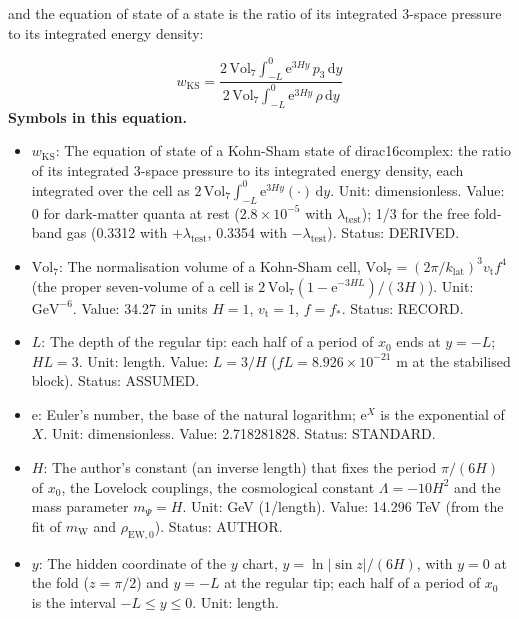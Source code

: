 \documentclass[
  10pt,
]{article}
\providecommand{\tightlist}{%
  \setlength{\itemsep}{0pt}\setlength{\parskip}{0pt}}
\begin{document}
and the equation of state of a state is the ratio of its integrated
3-space pressure to its integrated energy density:

\[ w_{\mathrm{KS}} = \frac{2\,\mathrm{Vol}_7\int_{-L}^{0}\mathrm{e}^{3Hy}\,p_3\,\mathrm{d}y}{2\,\mathrm{Vol}_7\int_{-L}^{0}\mathrm{e}^{3Hy}\,\rho\,\mathrm{d}y} \]
\textbf{Symbols in this equation.}

\begin{itemize}
\tightlist
\item
  \(w_{\mathrm{KS}}\): The equation of state of a Kohn-Sham state of
  dirac16complex: the ratio of its integrated 3-space pressure to its
  integrated energy density, each integrated over the cell as
  \(2\,\mathrm{Vol}_7\int_{-L}^{0}\mathrm{e}^{3Hy}(\cdot)\,\mathrm{d}y\).
  Unit: dimensionless. Value: 0 for dark-matter quanta at rest
  (\(2.8\times10^{-5}\) with \(\lambda_{\mathrm{test}}\)); 1/3 for the
  free fold-band gas (0.3312 with \(+\lambda_{\mathrm{test}}\), 0.3354
  with \(-\lambda_{\mathrm{test}}\)). Status: DERIVED.
\item
  \(\mathrm{Vol}_7\): The normalisation volume of a Kohn-Sham cell,
  \(\mathrm{Vol}_7 = (2\pi/k_{\mathrm{lat}})^3v_{\mathrm{t}}f^4\) (the
  proper seven-volume of a cell is
  \(2\,\mathrm{Vol}_7(1 - \mathrm{e}^{-3HL})/(3H)\)). Unit:
  \(\mathrm{GeV}^{-6}\). Value: 34.27 in units \(H = 1\),
  \(v_{\mathrm{t}} = 1\), \(f = f_*\). Status: RECORD.
\item
  \(L\): The depth of the regular tip: each half of a period of \(x_0\)
  ends at \(y = -L\); \(HL = 3\). Unit: length. Value: \(L = 3/H\)
  (\(fL = 8.926\times10^{-21}\) m at the stabilised block). Status:
  ASSUMED.
\item
  \(\mathrm{e}\): Euler's number, the base of the natural logarithm;
  \(\mathrm{e}^{X}\) is the exponential of \(X\). Unit: dimensionless.
  Value: 2.718281828. Status: STANDARD.
\item
  \(H\): The author's constant (an inverse length) that fixes the period
  \(\pi/(6H)\) of \(x_0\), the Lovelock couplings, the cosmological
  constant \(\Lambda = -10H^2\) and the mass parameter \(m_\Psi = H\).
  Unit: GeV (1/length). Value: 14.296 TeV (from the fit of
  \(m_{\mathrm{W}}\) and \(\rho_{\mathrm{EW},0}\)). Status: AUTHOR.
\item
  \(y\): The hidden coordinate of the \(y\) chart,
  \(y = \ln\lvert\sin z\rvert/(6H)\), with \(y = 0\) at the fold
  (\(z = \pi/2\)) and \(y = -L\) at the regular tip; each half of a
  period of \(x_0\) is the interval \(-L \le y \le 0\). Unit: length.

\end{itemize}
\end{document}
